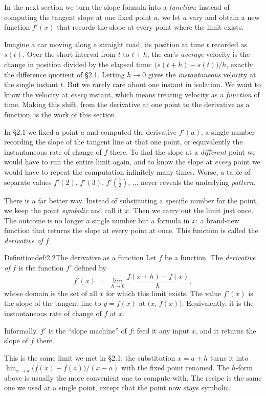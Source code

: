 \documentclass[a4paper,12pt,oneside]{memoir}
\begin{document}
In the next section we turn the slope formula into a \emph{function}: instead of computing the tangent slope at one fixed point \(a\), we let \(a\) vary and obtain a new function \(f'(x)\) that records the slope at every point where the limit exists.


Imagine a car moving along a straight road, its position at time \(t\) recorded as \(s(t)\). Over the short interval from \(t\) to \(t + h\), the car’s \emph{average} velocity is the change in position divided by the elapsed time: \(\bigl(s(t+h) - s(t)\bigr)/h\), exactly the difference quotient of §2.1. Letting \(h \to 0\) gives the \emph{instantaneous} velocity at the single instant \(t\). But we rarely care about one instant in isolation. We want to know the velocity at \emph{every} instant, which means treating velocity as a \emph{function} of time. Making this shift, from the derivative at one point to the derivative as a function, is the work of this section.

In §2.1 we fixed a point \(a\) and computed the derivative \(f'(a)\), a single number recording the slope of the tangent line at that one point, or equivalently the instantaneous rate of change of \(f\) there. To find the slope at a \emph{different} point we would have to run the entire limit again, and to know the slope at \emph{every} point we would have to repeat the computation infinitely many times. Worse, a table of separate values \(f'(2),\, f'(3),\, f'(\tfrac{7}{2}),\, \ldots\) never reveals the underlying \emph{pattern}.

There is a far better way. Instead of substituting a specific number for the point, we keep the point \emph{symbolic} and call it \(x\). Then we carry out the limit just once. The outcome is no longer a single number but a formula in \(x\): a brand-new function that returns the slope at every point at once. This function is called the \emph{derivative of \(f\)}.

\begin{envdefinition}{Definition}{def:2.2}{The derivative as a function}
Let \(f\) be a function. The \emph{derivative of \(f\)} is the function \(f'\) defined by \[ f'(x) \;=\; \lim_{h \to 0} \frac{f(x + h) - f(x)}{h}, \] whose domain is the set of all \(x\) for which this limit exists. The value \(f'(x)\) is the slope of the tangent line to \(y = f(x)\) at \(\bigl(x,\, f(x)\bigr)\). Equivalently, it is the instantaneous rate of change of \(f\) at \(x\).

\begin{informal}
Informally, \(f'\) is the “slope machine” of \(f\): feed it any input \(x\), and it returns the slope of \(f\) there.
\end{informal}
\end{envdefinition}
This is the same limit we met in §2.1: the substitution \(x = a + h\) turns it into \(\lim_{x \to a}\bigl(f(x) - f(a)\bigr)/(x - a)\) with the fixed point renamed. The \(h\)-form above is usually the more convenient one to compute with. The recipe is the same one we used at a single point, except that the point now stays symbolic.
\end{document}

